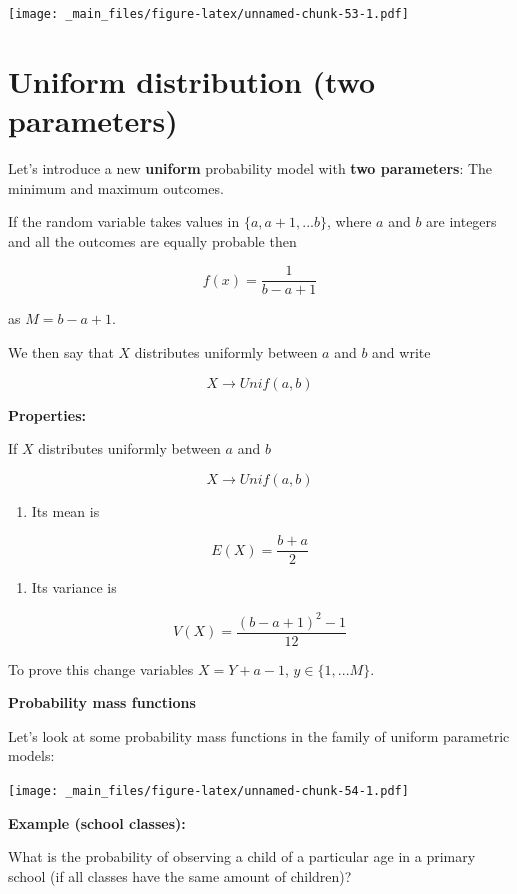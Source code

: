 \documentclass[
]{book}
\providecommand{\tightlist}{%
  \setlength{\itemsep}{0pt}\setlength{\parskip}{0pt}}
\begin{document}
\texttt{[image: \_main\_files/figure-latex/unnamed-chunk-53-1.pdf]}

\hypertarget{uniform-distribution-two-parameters}{%
\section{Uniform distribution (two parameters)}\label{uniform-distribution-two-parameters}}

Let's introduce a new \textbf{uniform} probability model with \textbf{two parameters}: The minimum and maximum outcomes.

If the random variable takes values in \(\{a, a+1, ...b\}\), where \(a\) and \(b\) are integers and all the outcomes are equally probable then

\[f(x)=\frac{1}{b-a+1}\]

as \(M=b-a+1\).

We then say that \(X\) distributes uniformly between \(a\) and \(b\) and write

\[X \rightarrow Unif(a,b)\]

\textbf{Properties:}

If \(X\) distributes uniformly between \(a\) and \(b\)

\[X \rightarrow Unif(a,b)\]

\begin{enumerate}
\def\labelenumi{\arabic{enumi})}
\tightlist
\item
  Its mean is
\end{enumerate}

\[E(X)= \frac{b+a}{2}\]

\begin{enumerate}
\def\labelenumi{\arabic{enumi})}
\setcounter{enumi}{1}
\tightlist
\item
  Its variance is
\end{enumerate}

\[V(X)= \frac{(b-a+1)^2-1}{12}\]

To prove this change variables \(X=Y+a-1\), \(y \in \{1,...M\}\).

\textbf{Probability mass functions}

Let's look at some probability mass functions in the family of uniform parametric models:

\texttt{[image: \_main\_files/figure-latex/unnamed-chunk-54-1.pdf]}

\textbf{Example (school classes):}

What is the probability of observing a child of a particular age in a primary school (if all classes have the same amount of children)?
\end{document}

